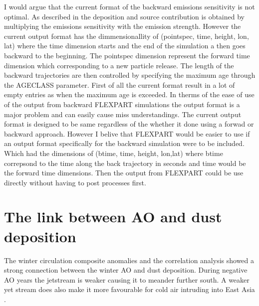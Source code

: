 I would argue that the current format of the backward emissions sensitivity is not optimal. As described in  the deposition and source contribution is obtained by multiplying the emissions sensitivity with the emission strength. However the current output format has the dimmensionallity of (pointspec, time, height, lon, lat) where the time dimension starts and the end of the simulation a  then goes backward to the beginning. The pointspec dimension represent the forward time dimension which corresponding to a new particle release. The length of the backward trajectories are then controlled by specifying the maximum age through the AGECLASS parameter. First of all the current format result in a lot of empty entries as when the maximum age is exceeded. In therms of the ease of use of the output from backward FLEXPART simulations the output format is a major problem and can easily cause miss understandings. The current output format is designed to be same regardless of the whether it done using a forwad or backward approach. However I belive that FLEXPART would be easier to use if an output format specifically for the backward simulation were to be included. Which had the dimensions of (btime, time, height, lon,lat) where btime correpsond to the time along the back trajectory in seconds and time would be the forward time dimensions. Then the output from FLEXPART could be use directly without having to post processes first. 

\section{The link between AO and dust deposition}
The winter circulation composite anomalies and the correlation analysis showed a strong connection between the winter AO and dust deposition. During negative AO years the jetstream is weaker causing it to meander further south. A weaker yet stream does also make it more favourable for cold air intruding into East Asia \parencite{he2017impact}.  